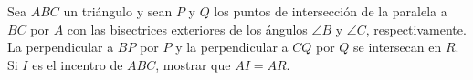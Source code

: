 Sea $ABC$ un triángulo y sean $P$ y $Q$ los puntos de intersección de la paralela a $BC$ por $A$ con las bisectrices exteriores de los ángulos $\angle B$ y $\angle C$, respectivamente. La perpendicular a $BP$ por $P$ y la perpendicular a $CQ$ por $Q$ se intersecan en $R$. Si $I$ es el incentro de $ABC$, mostrar que $AI = AR$.
